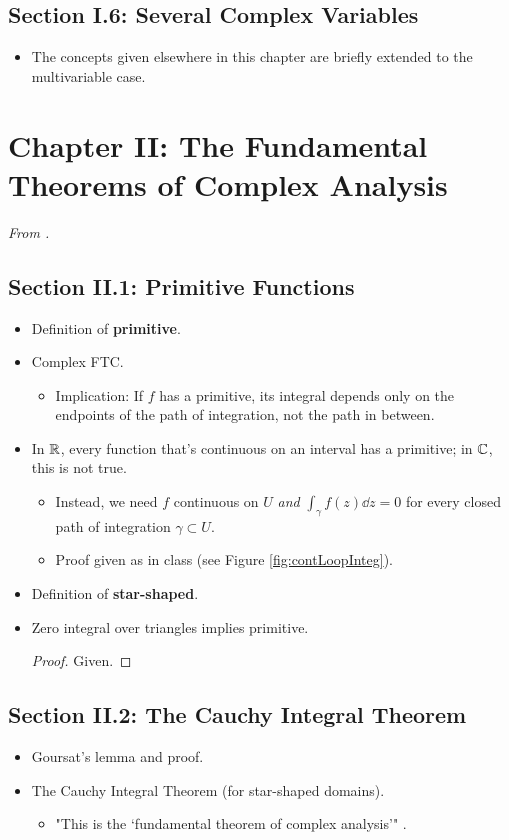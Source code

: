 \documentclass[../notes.tex]{subfiles}
\begin{document}
\subsection*{Section I.6: Several Complex Variables}
\begin{itemize}
    \item The concepts given elsewhere in this chapter are briefly extended to the multivariable case.
\end{itemize}



\section{Chapter II: The Fundamental Theorems of Complex Analysis}
\emph{From \textcite{bib:FischerLieb}.}
\subsection*{Section II.1: Primitive Functions}
\begin{itemize}
    \item Definition of \textbf{primitive}.
    \item Complex FTC.
    \begin{itemize}
        \item Implication: If $f$ has a primitive, its integral depends only on the endpoints of the path of integration, not the path in between.
    \end{itemize}
    \item In $\mathbb{R}$, every function that's continuous on an interval has a primitive; in $\mathbb{C}$, this is not true.
    \begin{itemize}
        \item Instead, we need $f$ continuous on $U$ \emph{and} $\int_\gamma f(z)\dd{z}=0$ for every closed path of integration $\gamma\subset U$.
        \item Proof given as in class (see Figure \ref{fig:contLoopInteg}).
    \end{itemize}
    \item Definition of \textbf{star-shaped}.
    \item Zero integral over triangles implies primitive.
    \begin{proof}
        Given.
    \end{proof}
\end{itemize}


\subsection*{Section II.2: The Cauchy Integral Theorem}
\begin{itemize}
    \item Goursat's lemma and proof.
    \item The Cauchy Integral Theorem (for star-shaped domains).
    \begin{itemize}
        \item "This is the `fundamental theorem of complex analysis'" \parencite[43]{bib:FischerLieb}.
    \end{itemize}
\end{itemize}
\end{document}
